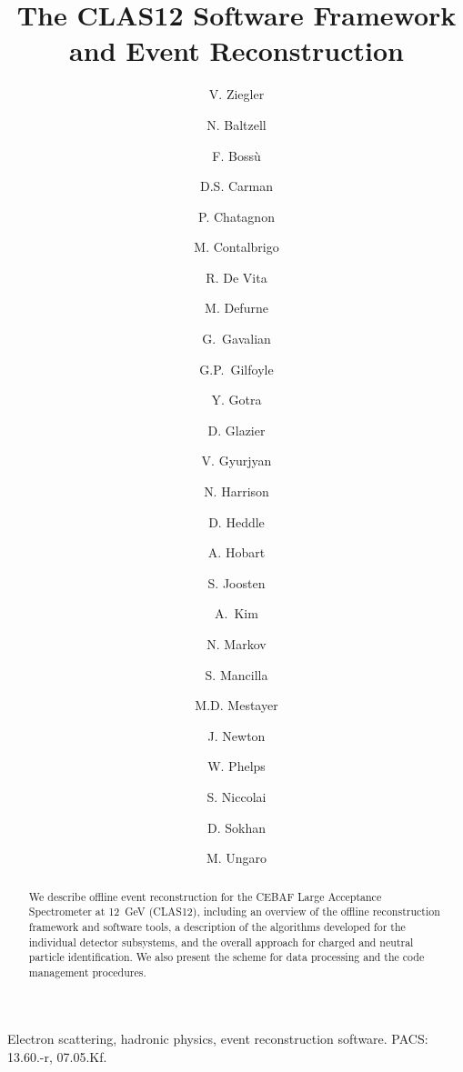\documentclass[3p,times,twocolumn]{elsarticle}
\begin{document}
\begin{frontmatter}

\title{The CLAS12 Software Framework and Event Reconstruction}

\author[JLab]{V. Ziegler }
\author[JLab]{N. Baltzell}
\author[Saclay]{F. Boss\`u}
\author[JLab]{D.S. Carman}
\author[IPNO]{P. Chatagnon}
\author[INFNFE]{M. Contalbrigo}
\author[INFNGE]{R. De Vita}
\author[Saclay]{M. Defurne}
\author[JLab]{G.~Gavalian}
\author[RichU]{G.P.~Gilfoyle}
\author[JLab]{Y. Gotra}
\author[Glasgow]{D. Glazier}
\author[JLab]{V. Gyurjyan}
\author[JLab]{N. Harrison}
\author[CNU]{D. Heddle}
\author[IPNO]{A. Hobart}
\author[ANL]{S. Joosten}
\author[UConn]{A.~Kim}
\author[JLab]{N. Markov}
\author[Chile]{S. Mancilla}
\author[JLab]{M.D. Mestayer}
\author[ODU]{J. Newton}
\author[CNU]{W. Phelps}
\author[IPNO]{S. Niccolai}
\author[Glasgow]{D. Sokhan}
\author[JLab]{M. Ungaro}

\address[JLab]{Thomas Jefferson National Accelerator Facility, Newport News, VA 23606, USA}
\address[Saclay]{CEA-Saclay, Univ. Paris-Sud, Universit\'e Paris-Saclay, Gif-sur-Yvettes, France}
\address[IPNO]{Institut de Physique Nucl\'eaire, CNRS-IN2P3, Univ. Paris-Sud, Universit\'e Paris-Saclay,
91406 Orsay Cedex, France}
\address[INFNFE]{INFN, Sezione di Ferrara, 44100 Ferrara, Italy}
\address[INFNGE]{INFN, Sezione di Genova, 16146 Genova, Italy}
\address[RichU]{University of Richmond, Richmond, 23173 VA , USA}
\address[Glasgow]{University of Glasgow, Glasgow G12 8QQ, United Kingdom}
\address[CNU]{Christopher Newport University, Newport News, 23606 VA , USA}
\address[ANL]{Argonne National Laboratory, Chicago, 60439 IL, USA}
\address[UConn]{University of Connecticut, Storrs, CT 06269, USA}
\address[Chile]{Universidad T\'{e}cnica Federico Santa Mar\'{i}a, Valparaiso, 2390123, Chile}
\address[ODU]{Old Dominion University, Norfolk, 23529 VA, USA}



\begin{abstract}
  We describe offline event reconstruction for the CEBAF Large Acceptance Spectrometer at 12~GeV (CLAS12),
  including an overview of the offline reconstruction framework and software tools, a description of the algorithms
  developed for the individual detector subsystems, and the overall approach for charged and neutral particle
  identification. We also present the scheme for data processing and the code management procedures.
\end{abstract}

\begin{keyword}
Electron scattering, hadronic physics, event reconstruction software. PACS: 13.60.-r, 07.05.Kf.
\end{keyword}

\end{frontmatter}
\end{document}
